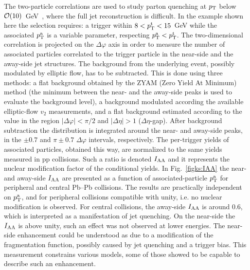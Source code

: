 The two-particle correlations are used to study parton quenching at $p_{\rm T}$ below ${\cal O}(10)$~GeV~\cite{Aamodt:2011vg}, where the full jet reconstruction is difficult. In the example shown here the selection requires: a trigger within $8 < p_{\rm T}^{\rm t} < 15$~GeV while the associated $p_{\rm T}^{\rm a}$ is a variable parameter, respecting $p_{\rm T}^{\rm a} <p_{\rm T}^{\rm t}$. The two-dimensional correlation is projected on the $\Delta\varphi$ axis in order to measure the number of associated particles correlated to the trigger particle in the near-side and the away-side jet structures. The background from the underlying event, possibly modulated by elliptic flow, has to be subtracted. This is done using three methods: a flat background obtained by the ZYAM (Zero Yield At Minimum) method (the minimum between the near- and the away-side peaks is used to evaluate the background level), a background modulated according the available elliptic-flow $v_2$ measurements, and a flat background estimated according to the value in the region $|\Delta\varphi| < \pi/2$ and $|\Delta\eta| > 1$  ($\Delta\eta$-gap). After background subtraction the distribution is integrated around the near- and away-side peaks, in the $\pm 0.7$ and $\pi \pm 0.7$ $\Delta\varphi$ intervals, respectively. The per-trigger yields of associated particles, obtained this way, are normalized to the same yields measured in pp collisions. Such a ratio is denoted $I_{\rm AA}$ and it represents the nuclear modification factor of the conditional yields. In Fig.~\ref{figks:IAA} the near- and away-side $I_{\rm AA}$ are presented as a function of associated-particle $p_{\rm T}^{\rm a}$ for peripheral and central Pb--Pb collisions. The results are practically independent on $p_{\rm T}^{\rm a}$, and for peripheral collisions compatible with unity, i.e. no nuclear modification is observed. For central collisions, the away-side $I_{\rm AA}$ is around 0.6, which is interpreted as a manifestation of jet quenching. On the near-side the $I_{\rm AA}$ is above unity, such an effect was not observed at lower energies. The near-side enhancement could be understood as due to a modification of the fragmentation function, possibly caused by jet quenching and a trigger bias. This measurement constrains various models, some of those showed to be capable to describe such an enhancement.


